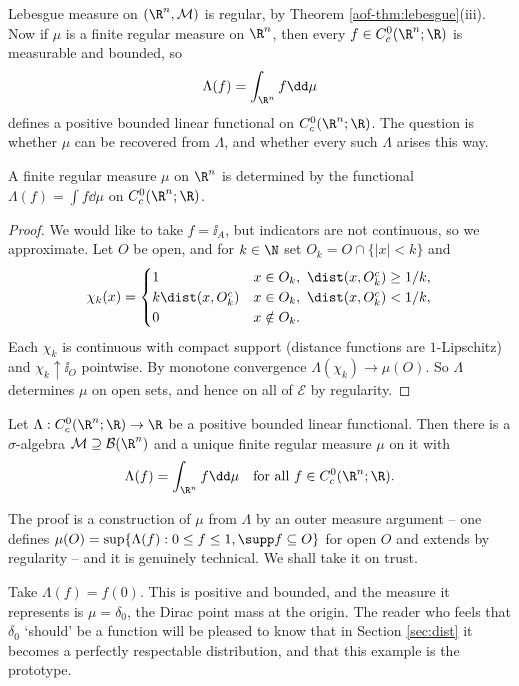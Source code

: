 Lebesgue measure on $(\R^n, \mathcal{M})$ is regular, by Theorem \ref{aof-thm:lebesgue}(iii). Now if $\mu$ is a finite regular measure on $\R^n$, then every $f \in C^0_c(\R^n;\R)$ is measurable and bounded, so
$$\Lambda(f) = \int_{\R^n} f \dd \mu$$
defines a positive bounded linear functional on $C^0_c(\R^n;\R)$. The question is whether $\mu$ can be recovered from $\Lambda$, and whether every such $\Lambda$ arises this way.

\begin{lemma}\label{lem:measuredetermined}
	A finite regular measure $\mu$ on $\R^n$ is determined by the functional $\Lambda(f) = \int f \dd\mu$ on $C_c^0(\R^n;\R)$.
\end{lemma}

\begin{proof}
	We would like to take $f = \ii_A$, but indicators are not continuous, so we approximate. Let $O$ be open, and for $k \in \N$ set $O_k = O \cap \{|x| < k\}$ and
	$$\chi_k(x) = \begin{cases} 1 & x \in O_k, \ \dist(x, O_k^c) \ge 1/k, \\ k\dist(x, O_k^c) & x \in O_k, \ \dist(x,O_k^c) < 1/k, \\ 0 & x \notin O_k.\end{cases}$$
	Each $\chi_k$ is continuous with compact support (distance functions are $1$-Lipschitz) and $\chi_k \uparrow \ii_O$ pointwise. By monotone convergence $\Lambda(\chi_k) \to \mu(O)$. So $\Lambda$ determines $\mu$ on open sets, and hence on all of $\mathcal{E}$ by regularity.
\end{proof}

\begin{theorem}\label{thm:rieszmarkov}
	Let $\Lambda : C_c^0(\R^n;\R) \to \R$ be a positive bounded linear functional. Then there is a $\sigma$-algebra $\mathcal{M} \supseteq \mathcal{B}(\R^n)$ and a unique finite regular measure $\mu$ on it with
	$$\Lambda(f) = \int_{\R^n} f \dd \mu \quad \text{for all } f \in C_c^0(\R^n;\R).$$
\end{theorem}

The proof is a construction of $\mu$ from $\Lambda$ by an outer measure argument -- one defines $\mu(O) = \sup\{\Lambda(f) : 0 \le f \le 1, \supp f \subseteq O\}$ for open $O$ and extends by regularity -- and it is genuinely technical. We shall take it on trust.

\begin{example}
	Take $\Lambda(f) = f(0)$. This is positive and bounded, and the measure it represents is $\mu = \delta_0$, the Dirac point mass at the origin. The reader who feels that $\delta_0$ `should' be a function will be pleased to know that in Section \ref{sec:dist} it becomes a perfectly respectable distribution, and that this example is the prototype.
\end{example}

